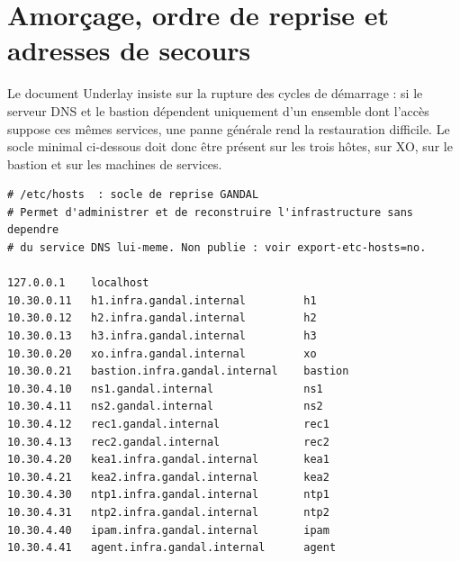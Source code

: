 \section{Amorçage, ordre de reprise et adresses de secours}
\label{sec:amorcage}

Le document Underlay insiste sur la rupture des cycles de démarrage : si le
serveur DNS et le bastion dépendent uniquement d'un ensemble dont l'accès
suppose ces mêmes services, une panne générale rend la restauration difficile.
Le socle minimal ci-dessous doit donc être présent sur les trois hôtes, sur XO,
sur le bastion et sur les machines de services.

\begin{lstlisting}[language=pdnsconf,caption={Adresses de secours à conserver
  hors du service DNS},label=lst:hosts]
# /etc/hosts  : socle de reprise GANDAL
# Permet d'administrer et de reconstruire l'infrastructure sans dependre
# du service DNS lui-meme. Non publie : voir export-etc-hosts=no.

127.0.0.1    localhost
10.30.0.11   h1.infra.gandal.internal         h1
10.30.0.12   h2.infra.gandal.internal         h2
10.30.0.13   h3.infra.gandal.internal         h3
10.30.0.20   xo.infra.gandal.internal         xo
10.30.0.21   bastion.infra.gandal.internal    bastion
10.30.4.10   ns1.gandal.internal              ns1
10.30.4.11   ns2.gandal.internal              ns2
10.30.4.12   rec1.gandal.internal             rec1
10.30.4.13   rec2.gandal.internal             rec2
10.30.4.20   kea1.infra.gandal.internal       kea1
10.30.4.21   kea2.infra.gandal.internal       kea2
10.30.4.30   ntp1.infra.gandal.internal       ntp1
10.30.4.31   ntp2.infra.gandal.internal       ntp2
10.30.4.40   ipam.infra.gandal.internal       ipam
10.30.4.41   agent.infra.gandal.internal      agent
\end{lstlisting}

